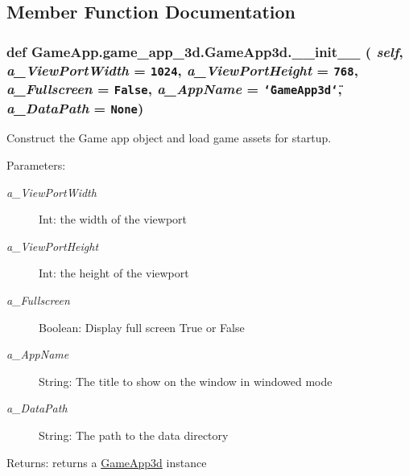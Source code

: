 \subsection{Member Function Documentation}
\hypertarget{classGameApp_1_1game__app__3d_1_1GameApp3d_5b5e3b363668e2ab600a5543e4fe8170}{
\subsubsection[\_\-\_\-init\_\-\_\-]{\setlength{\rightskip}{0pt plus 5cm}def GameApp.game\_\-app\_\-3d.GameApp3d.\_\-\_\-init\_\-\_\- ( {\em self}, \/   {\em a\_\-ViewPortWidth} = {\tt 1024}, \/   {\em a\_\-ViewPortHeight} = {\tt 768}, \/   {\em a\_\-Fullscreen} = {\tt False}, \/   {\em a\_\-AppName} = {\tt \char`\"{}GameApp3d\char`\"{}}, \/   {\em a\_\-DataPath} = {\tt None})}}
\label{classGameApp_1_1game__app__3d_1_1GameApp3d_5b5e3b363668e2ab600a5543e4fe8170}


Construct the Game app object and load game assets for startup. 

\begin{Desc}
\item[Parameters:]
\begin{description}
\item[{\em a\_\-ViewPortWidth}]Int: the width of the viewport \item[{\em a\_\-ViewPortHeight}]Int: the height of the viewport \item[{\em a\_\-Fullscreen}]Boolean: Display full screen True or False \item[{\em a\_\-AppName}]String: The title to show on the window in windowed mode \item[{\em a\_\-DataPath}]String: The path to the data directory \end{description}
\end{Desc}
\begin{Desc}
\item[Returns:]returns a \hyperlink{classGameApp_1_1game__app__3d_1_1GameApp3d}{GameApp3d} instance \end{Desc}



